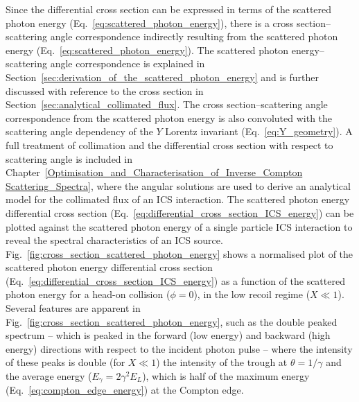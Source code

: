 \documentclass[../main.tex]{subfiles}
\begin{document}
Since the differential cross section can be expressed in terms of the scattered photon energy (Eq.~\ref{eq:scattered_photon_energy}), there is a cross section--scattering angle correspondence indirectly resulting from the scattered photon energy (Eq.~\ref{eq:scattered_photon_energy}). The scattered photon energy--scattering angle correspondence is explained in Section~\ref{sec:derivation_of_the_scattered_photon_energy} and is further discussed with reference to the cross section in Section~\ref{sec:analytical_collimated_flux}. The cross section--scattering angle correspondence from the scattered photon energy is also convoluted with the scattering angle dependency of the $Y$ Lorentz invariant (Eq.~\ref{eq:Y_geometry}). A full treatment of collimation and the differential cross section with respect to scattering angle is included in Chapter~\ref{Optimisation_and_Characterisation_of_Inverse_Compton Scattering_Spectra}, where the angular solutions are used to derive an analytical model for the collimated flux of an ICS interaction.    
The scattered photon energy differential cross section (Eq.~\ref{eq:differential_cross_section_ICS_energy}) can be plotted against the scattered photon energy of a single particle ICS interaction to reveal the spectral characteristics of an ICS source. Fig.~\ref{fig:cross_section_scattered_photon_energy} shows a normalised plot of the scattered photon energy differential cross section (Eq.~\ref{eq:differential_cross_section_ICS_energy}) as a function of the scattered photon energy for a head-on collision ($\phi=0$), in the low recoil regime ($X \ll 1$). Several features are apparent in Fig.~\ref{fig:cross_section_scattered_photon_energy}, such as the double peaked spectrum -- which is peaked in the forward (low energy) and backward (high energy) directions with respect to the incident photon pulse -- where the intensity of these peaks is double (for $X \ll 1$) the intensity of the trough at $\theta=1/\gamma$ and the average energy ($E_{\gamma} = 2\gamma^{2}E_{L}$), which is half of the maximum energy (Eq.~\ref{eq:compton_edge_energy}) at the Compton edge.   
\end{document}
